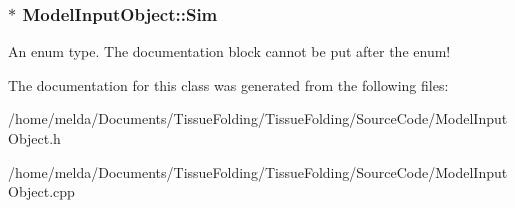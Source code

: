 \subsubsection[{Sim}]{$\ast$ Model\+Input\+Object\+::\+Sim}\label{classModelInputObject_a0c5fb50d9d705bc9a9b4fafeebd1cadc}
An enum type. The documentation block cannot be put after the enum! 

The documentation for this class was generated from the following files\+:\begin{DoxyCompactItemize}
\item 
/home/melda/\+Documents/\+Tissue\+Folding/\+Tissue\+Folding/\+Source\+Code/Model\+Input\+Object.\+h\item 
/home/melda/\+Documents/\+Tissue\+Folding/\+Tissue\+Folding/\+Source\+Code/Model\+Input\+Object.\+cpp\end{DoxyCompactItemize}
